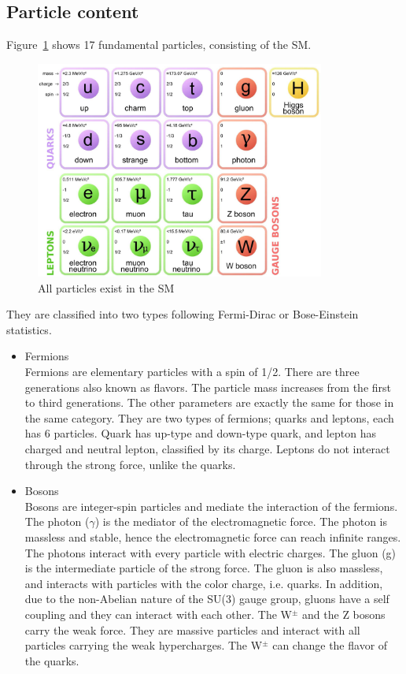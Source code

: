 \subsection{Particle content}
Figure~\ref{fig:SM} shows 17 fundamental particles, consisting of the SM.
\begin{figure}[tbp]
\begin{center}
 \includegraphics[width=0.85\textwidth,keepaspectratio]{figures/SM}
\caption{
All particles exist in the SM %
}
\label{fig:SM}
\end{center}
\end{figure}
They are classified into two types following Fermi-Dirac or Bose-Einstein statistics.
\begin{itemize}
    \item Fermions \\
    Fermions are elementary particles with a spin of 1/2. There are three generations also known as flavors.  
    The particle mass increases from the first to third generations. 
    The other parameters are exactly the same for those in the same category. They are two types of fermions; quarks and leptons, each has 6 particles. 
    Quark has up-type and down-type quark, and lepton has charged and neutral lepton, classified by its charge. Leptons do not interact through the strong force, unlike the quarks.
    \item Bosons \\
    Bosons are integer-spin particles and mediate the interaction of the fermions.
    The photon ($\gamma$) is the mediator of the electromagnetic force. The photon is massless and stable, hence the electromagnetic force can reach infinite ranges. 
    The photons interact with every particle with electric charges.
    The gluon (g) is the intermediate particle of the strong force. The gluon is also massless, and interacts with particles with the color charge, i.e. quarks.
    In addition, due to the non-Abelian nature of the SU(3) gauge group, gluons have a self coupling and they can interact with each other.
    The W$^\pm$ and the Z bosons carry the weak force. They are massive particles and interact with all particles carrying the weak hypercharges. 
    The W$^\pm$ can change the flavor of the quarks. 
\end{itemize}

